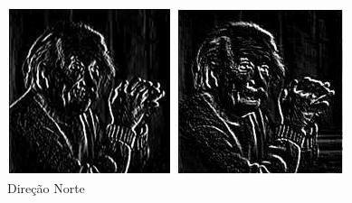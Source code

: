 \documentclass[a4paper, 12pt]{article}
\begin{document}
\begin{figure}[!htb]
	\centering
	  	\includegraphics[width=\linewidth]{images/robinson1.jpg}
	  	\caption{Direção Norte}
	\endminipage\hspace{1cm}
	 	\includegraphics[width=\linewidth]{images/robinson2.jpg}

\end{figure}
\end{document}
